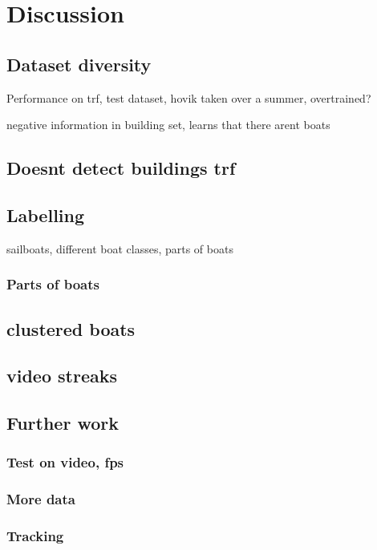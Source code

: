 \chapter{Discussion}

\section{Dataset diversity}
\label{dataset_divers}
Performance on trf, test dataset, hovik taken over a summer, overtrained?

negative information in building set, learns that there arent boats

\section{Doesnt detect buildings trf}
\label{sec:build_trf}

\section{Labelling}
sailboats, different boat classes, parts of boats

\subsection{Parts of boats}
\label{sec:boat_parts}

\section{clustered boats}



\section{video streaks}



\section{Further work}
\subsection{Test on video, fps}
\subsection{More data}
\subsection{Tracking}